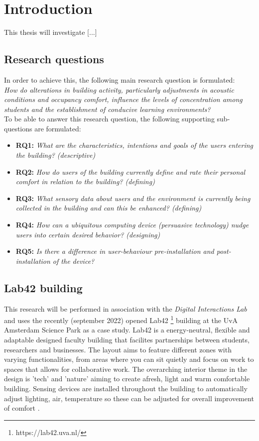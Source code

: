 \section{Introduction}

This thesis will investigate [...] 

\subsection{Research questions}

In order to achieve this, the following main research question is formulated: \\

\emph{How do alterations in building activity, particularly adjustments in acoustic conditions and occupancy comfort, influence the levels of concentration among students and the establishment of conducive learning environments?} \\

To be able to answer this research question, the following supporting sub-questions are formulated:

\begin{itemize}
    \item \textbf{RQ1:} \emph{What are the characteristics, intentions and goals of the users entering the building? (descriptive)}
    \item \textbf{RQ2:} \emph{How do users of the building currently define and rate their personal comfort in relation to the building? (defining)}
    \item \textbf{RQ3:} \emph{What sensory data about users and the environment is currently being collected in the building and can this be enhanced? (defining)}
    \item \textbf{RQ4:} \emph{How can a ubiquitous computing device (persuasive technology) nudge users into certain desired behavior? (designing)}
    \item \textbf{RQ5:} \emph{Is there a difference in user-behaviour pre-installation and post-installation of the device?}
\end{itemize}

\subsection{Lab42 building}

This research will be performed in association with the \emph{Digital Interactions Lab} and uses the recently (september 2022) opened Lab42 \footnote{https://lab42.uva.nl/} building at the UvA Amsterdam Science Park as a case study. Lab42 is a energy-neutral, flexible and adaptable designed faculty building that facilites partnerships between students, researchers and businesses. \cite{crouwel} The layout aims to feature different zones with varying functionalities, from areas where you can sit quietly and focus on work to spaces that allows for collaborative work. The overarching interior theme in the design is 'tech' and 'nature' aiming to create afresh, light and warm comfortable building. Sensing devices are installed throughout the building to automatically adjust lighting, air, temperature so these can be adjusted for overall improvement of comfort \cite{faculty}.